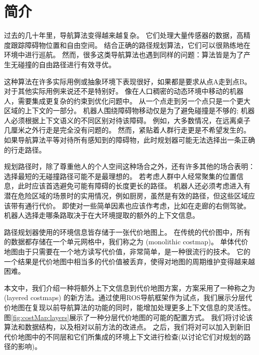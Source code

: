 

\section{简介}

过去的几十年里，导航算法变得越来越复杂。
它们处理大量传感器的数据，高精度跟踪障碍物位置和自由空间。
结合正确的路径规划算法，它们可以很熟练地在环境中进行巡航。
然而，很多这类导航算法也遇到同样的问题：算法皆是为了产生无碰撞的自由路径进行有效寻优。

这种算法在许多实际用例或抽象环境下表现很好，如果都是要求从点A走到点B。
对于其他实际用例来说还不是特别好。
像在人口稠密的动态环境中移动的机器人，需要集成更复杂的约束到优化问题中。
从一个点走到另一个点只是一个更大区域的上下文的一部分。
机器人围绕障碍物移动仅是为了避免碰撞是不够的;
机器人必须根据上下文语义的不同区别对待该障碍。
例如，大多数情况，在远离桌子几厘米之外行走是完全没有问题的。
然而，紧贴着人群行走更是不希望发生的。
如果导航算法平等对待所有感知到的障碍物，此时规划器可能无法选择出一条正确的行走路径。


规划路径时，除了尊重他人的个人空间这种场合之外，还有许多其他的场合表明：选择最短的无碰撞路径可能不是最理想的。
若考虑人群中人经常聚集的位置信息，此时应该首选避免可能有障碍的长度更长的路径。
机器人还必须考虑进入有潜在危险区域的场景时的实用情况，例如厨房，虽然是有效的路径，但这些区域应该带有通行代价。
即使对一些简单因素也应该作考虑，比如在走廊的右侧驾驶。
机器人选择走哪条路取决于在大环境提取的额外的上下文信息。

路径规划器使用的环境信息皆存储于一张代价地图上。
在传统的代价图中，所有的数据都存储在一个单元网格中，我们称之为 (monolithic costmap)。
单体代价地图由于只需要在一个地方读写代价值，非常简单，是一种很流行的技术。
它的一个结果是代价地图中相当多的代价值被丢弃，使得对地图的周期维护变得越来越困难。

本文中，我们介绍一种将额外上下文信息到代价地图方案，方案采用了一种称之为 (layered costmaps) 的新方法。通过使用ROS导航框架作为试点，我们展示分层代价地图在复现以前导航算法的功能的同时，能增加处理更多上下文信息的灵活性。
图\ref{fig:costMap:layers}展示了一种分层代价地图的可能的配置方式。
我们将讨论该算法和数据结构，以及相对以前方法的改进点。
之后，我们将对可以加入到新旧代价地图中的不同层和它们所集成的环境上下文进行检查(以讨论它们对规划的路径的影响)。


